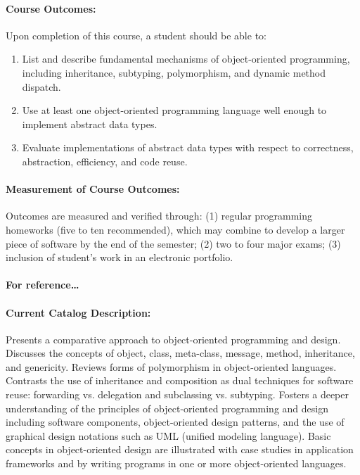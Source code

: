 \documentclass[11pt]{article}
\begin{document}
\paragraph{Course Outcomes:}
%
Upon completion of this course, a student should be able to: 
%
\begin{enumerate}
\item
List and describe fundamental mechanisms of object-oriented
programming, including inheritance, subtyping, polymorphism,
and dynamic method dispatch.
\item
Use at least one object-oriented programming language well
enough to implement abstract data types.
\item
Evaluate implementations of abstract data types with respect
to correctness, abstraction, efficiency, and code reuse.
\end{enumerate}

\paragraph{Measurement of Course Outcomes:}
%
Outcomes are measured and verified through: (1) regular programming
homeworks (five to ten recommended), which may combine to develop
a larger piece of software by the end of the semester; (2) two to four
major exams; (3) inclusion of student's work in an electronic portfolio.

\pagebreak

\paragraph{For reference\ldots}

\paragraph{Current Catalog Description:}
%
Presents a comparative approach to object-oriented programming
and design. Discusses the concepts of object, class, meta-class,
message, method, inheritance, and genericity. Reviews forms of
polymorphism in object-oriented languages. Contrasts the use of
inheritance and composition as dual techniques for software reuse:
forwarding vs. delegation and subclassing vs. subtyping. Fosters
a deeper understanding of the principles of object-oriented
programming and design including software components,
object-oriented design patterns, and the use of graphical design
notations such as UML (unified modeling language). Basic concepts
in object-oriented design are illustrated with case studies in
application frameworks and by writing programs in one or more
object-oriented languages.
\end{document}
